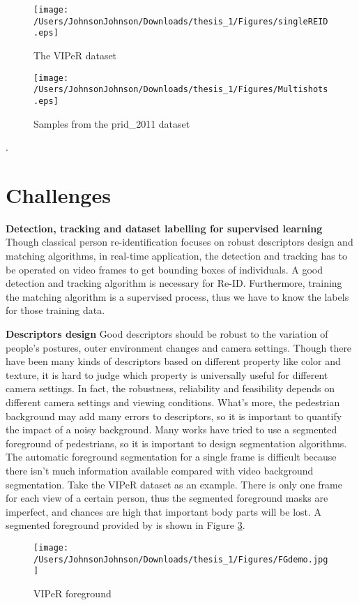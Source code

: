 \begin{figure}[H]

\texttt{[image: /Users/JohnsonJohnson/Downloads/thesis\_1/Figures/singleREID.eps]}
\vspace{-3em}
\caption{The VIPeR dataset}
\label{VIPeRimages}
\end{figure}


\begin{figure}[H]

\texttt{[image: /Users/JohnsonJohnson/Downloads/thesis\_1/Figures/Multishots.eps]}
\vspace{-3em}
\caption{Samples from the prid\_2011 dataset}
\label{PRID2011images}
\end{figure}


.

\section{Challenges}

\textbf{Detection, tracking and dataset labelling for supervised learning} Though classical person re-identification focuses on robust descriptors design and matching algorithms, in real-time application, the detection and tracking has to be operated on video frames to get bounding boxes of individuals. A good detection and tracking algorithm is necessary for Re-ID. Furthermore, training the matching algorithm is a supervised process, thus we have to know the labels for those training data. 

\textbf{Descriptors design} Good descriptors should be robust to the variation of people's postures, outer environment changes and camera settings. Though there have been many kinds of descriptors based on different property like color and texture, it is hard to judge which property is universally useful for different camera settings. In fact, the robustness, reliability and feasibility depends on different camera settings and viewing conditions. What's more, the pedestrian background may add many errors to descriptors, so it is important to quantify the impact of a noisy background. Many works have tried to use a segmented foreground of pedestrians, so it is important to design segmentation algorithms. The automatic foreground segmentation for a single frame is difficult because there isn't much information available compared with video background segmentation. Take the VIPeR dataset as an example. There is only one frame for each view of a certain person, thus the segmented foreground masks are imperfect, and chances are high that important body parts will be lost. A segmented foreground provided by \cite{SDALF} is shown in Figure \ref{VIPeRFG}.
\begin{figure}[H]
\centering
\texttt{[image: /Users/JohnsonJohnson/Downloads/thesis\_1/Figures/FGdemo.jpg]}
\vspace{-3em}
\caption{VIPeR foreground}
\label{VIPeRFG}
\end{figure}

